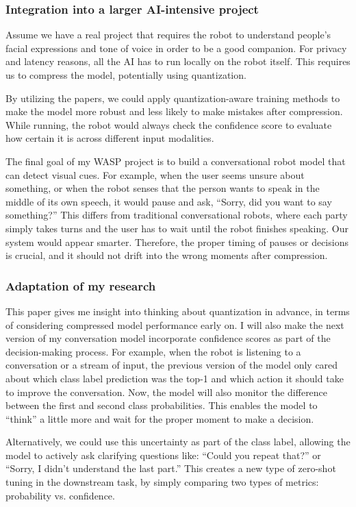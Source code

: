 \documentclass[11pt]{article}
\begin{document}
\subsubsection{Integration into a larger AI-intensive project}
Assume we have a real project that requires the robot to understand people’s facial expressions and tone of voice in order to be a good companion. For privacy and latency reasons, all the AI has to run locally on the robot itself. This requires us to compress the model, potentially using quantization.

By utilizing the papers, we could apply quantization-aware training methods to make the model more robust and less likely to make mistakes after compression. While running, the robot would always check the confidence score to evaluate how certain it is across different input modalities.

The final goal of my WASP project is to build a conversational robot model that can detect visual cues. For example, when the user seems unsure about something, or when the robot senses that the person wants to speak in the middle of its own speech, it would pause and ask, “Sorry, did you want to say something?” This differs from traditional conversational robots, where each party simply takes turns and the user has to wait until the robot finishes speaking. Our system would appear smarter. Therefore, the proper timing of pauses or decisions is crucial, and it should not drift into the wrong moments after compression.

\subsubsection{Adaptation of my research}
This paper gives me insight into thinking about quantization in advance, in terms of considering compressed model performance early on. I will also make the next version of my conversation model incorporate confidence scores as part of the decision-making process. For example, when the robot is listening to a conversation or a stream of input, the previous version of the model only cared about which class label prediction was the top-1 and which action it should take to improve the conversation. Now, the model will also monitor the difference between the first and second class probabilities. This enables the model to “think” a little more and wait for the proper moment to make a decision.

Alternatively, we could use this uncertainty as part of the class label, allowing the model to actively ask clarifying questions like: “Could you repeat that?” or “Sorry, I didn’t understand the last part.” This creates a new type of zero-shot tuning in the downstream task, by simply comparing two types of metrics: probability vs. confidence.
\end{document}
